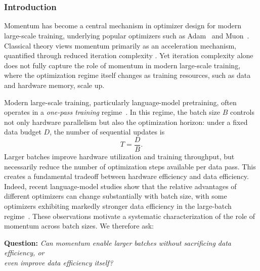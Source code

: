 \documentclass[11pt]{article}
\begin{document}

\doparttoc
\faketableofcontents
\part{}

\vspace*{-2.5em}
\section{Introduction}

Momentum has become a central mechanism in  optimizer design for modern large-scale training, underlying popular optimizers such as Adam~\citep{kingma2015adam} and Muon~\citep{jordan2024muon,liu2025muon}. Classical theory views momentum primarily as an acceleration mechanism,   quantified through  reduced iteration complexity
\citep{nesterov1983method,su2016differential,wibisono2016variational,
wilson2021lyapunov,gitman2019understanding,velikanov2023view,
wang2024marginal,liu2019acceleratingsgdmomentumoverparameterized,
gupta2024nesterov}. Yet iteration complexity alone does not fully capture the role of momentum in modern large-scale training, where the optimization regime itself changes as training resources, such as data and hardware memory, scale up.

Modern large-scale training, particularly language-model pretraining, often operates in a \emph{one-pass training} regime~\citep{brown2020language}. In this regime, the batch size \(B\) controls not only hardware parallelism but also the optimization horizon: under a fixed data budget \(D\), the number of sequential updates is
\[
T=\frac{D}{B}.
\]
Larger batches improve hardware utilization and training throughput, but necessarily reduce the number of optimization steps available per data pass. This creates a fundamental tradeoff between hardware efficiency and data efficiency. Indeed, recent language-model studies show that the relative advantages of different optimizers can change substantially with batch size, with some optimizers exhibiting markedly stronger data efficiency in the large-batch regime~\citep{marek2026small,shah2025practical,semenov2025benchmarking}. These observations motivate a systematic characterization of the role of momentum across batch sizes. We therefore ask:
\begin{highlightedtheorem}
\begin{center}
\textbf{Question:} {\it Can momentum enable larger batches without sacrificing data efficiency, or\\
even improve data efficiency itself?}
\end{center}
\end{highlightedtheorem}
\end{document}
